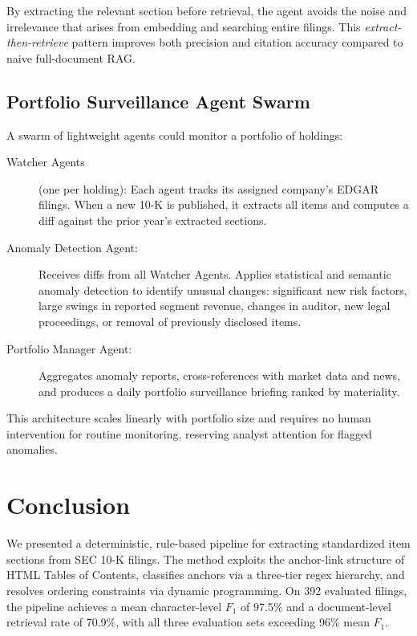\documentclass[12pt,letterpaper,oneside]{article}
\begin{document}
By extracting the relevant section before retrieval, the agent avoids
the noise and irrelevance that arises from embedding and searching
entire filings. This \emph{extract-then-retrieve} pattern improves
both precision and citation accuracy compared to naive full-document
RAG.

\subsection{Portfolio Surveillance Agent Swarm}

A swarm of lightweight agents could monitor a portfolio of holdings:

\begin{description}
  \item[Watcher Agents] (one per holding):
    Each agent tracks its assigned company's EDGAR filings. When a
    new 10-K is published, it extracts all items and computes a
    diff against the prior year's extracted sections.

  \item[Anomaly Detection Agent:]
    Receives diffs from all Watcher Agents. Applies statistical
    and semantic anomaly detection to identify unusual changes:
    significant new risk factors, large swings in reported segment
    revenue, changes in auditor, new legal proceedings, or removal
    of previously disclosed items.

  \item[Portfolio Manager Agent:]
    Aggregates anomaly reports, cross-references with market data
    and news, and produces a daily portfolio surveillance briefing
    ranked by materiality.
\end{description}

This architecture scales linearly with portfolio size and requires
no human intervention for routine monitoring, reserving analyst
attention for flagged anomalies.


\section{Conclusion}\label{sec:conclusion}

We presented a deterministic, rule-based pipeline for extracting
standardized item sections from SEC 10-K filings. The method exploits
the anchor-link structure of HTML Tables of Contents, classifies
anchors via a three-tier regex hierarchy, and resolves ordering
constraints via dynamic programming. On 392 evaluated filings, the
pipeline achieves a mean character-level $F_1$ of 97.5\% and a
document-level retrieval rate of 70.9\%, with all three evaluation
sets exceeding 96\% mean $F_1$.
\end{document}
